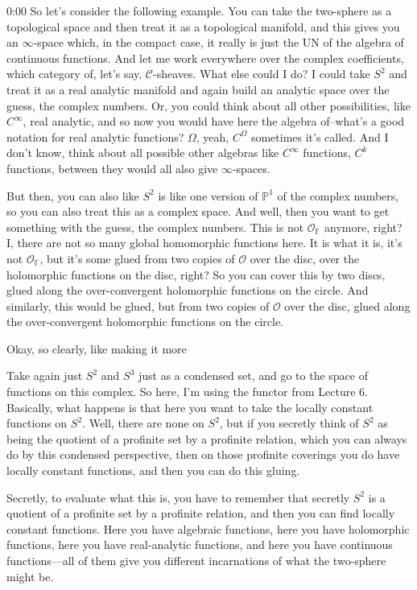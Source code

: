\begin{unfinished}{0:00}
So let's consider the following example. You can take the two-sphere as a topological space and then treat it as a topological manifold, and this gives you an $\infty$-space which, in the compact case, it really is just the $\mathrm{UN}$ of the algebra of continuous functions. And let me work everywhere over the complex coefficients, which category of, let's say, $\mathcal{C}$-sheaves. What else could I do? I could take $S^2$ and treat it as a real analytic manifold and again build an analytic space over the guess, the complex numbers. Or, you could think about all other possibilities, like $C^\infty$, real analytic, and so now you would have here the algebra of--what's a good notation for real analytic functions? $\Omega$, yeah, $C^\Omega$ sometimes it's called. And I don't know, think about all possible other algebras like $C^\infty$ functions, $C^k$ functions, between they would all also give $\infty$-spaces.

But then, you can also like $S^2$ is like one version of $\mathbb{P}^1$ of the complex numbers, so you can also treat this as a complex space. And well, then you want to get something with the guess, the complex numbers. This is not $\mathcal{O}_{\mathbb{F}}$ anymore, right? I, there are not so many global homomorphic functions here. It is what it is, it's not $\mathcal{O}_{\mathbb{F}}$, but it's some glued from two copies of $\mathcal{O}$ over the disc, over the holomorphic functions on the disc, right? So you can cover this by two discs, glued along the over-convergent holomorphic functions on the circle. And similarly, this would be glued, but from two copies of $\mathcal{O}$ over the disc, glued along the over-convergent holomorphic functions on the circle.

Okay, so clearly, like making it more



Take again just $S^2$ and $S^3$ just as a condensed set, and go to the space of functions on this complex. So here, I'm using the functor from Lecture 6. Basically, what happens is that here you want to take the locally constant functions on $S^2$. Well, there are none on $S^2$, but if you secretly think of $S^2$ as being the quotient of a profinite set by a profinite relation, which you can always do by this condensed perspective, then on those profinite coverings you do have locally constant functions, and then you can do this gluing. 

Secretly, to evaluate what this is, you have to remember that secretly $S^2$ is a quotient of a profinite set by a profinite relation, and then you can find locally constant functions. Here you have algebraic functions, here you have holomorphic functions, here you have real-analytic functions, and here you have continuous functions---all of them give you different incarnations of what the two-sphere might be.


\end{unfinished}
